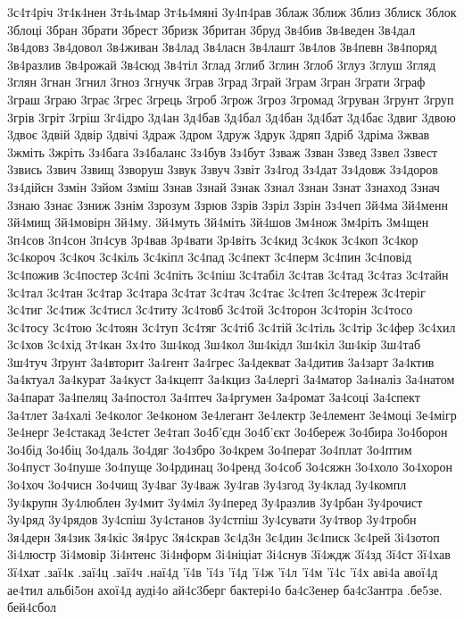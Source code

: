 {3с4т4річ
3т4к4нен
3т4ь4мар
3т4ь4мяні
3у4п4рав
3блаж
3ближ
3близ
3блиск
3блок
3блоці
3бран
3брати
3брест
3бризк
3британ
3бруд
3в4бив
3в4веден
3в4дал
3в4довз
3в4довол
3в4живан
3в4лад
3в4ласн
3в4лашт
3в4лов   
3в4певн
3в4поряд
3в4разлив
3в4рожай
3в4сюд
3в4тіл
3глад
3глиб
3глин
3глоб
3глуз
3глуш
3гляд
3глян
3гнан
3гнил
3гноз
3гнучк
3грав
3град
3грай
3грам
3гран
3грати
3граф
3граш
3граю
3грає
3грес
3грець
3гроб
3грож
3гроз
3громад
3груван
3грунт
3груп
3грів
3гріт
3гріш
3г4ідро
3д4ан
3д4бав
3д4бал
3д4бан
3д4бат
3д4бає
3двиг
3двою
3двоє
3двій
3двір
3двічі
3драж
3дром
3друж
3друк
3дряп
3дріб
3дріма
3жвав
3жміть
3жріть
3з4бага
3з4баланс
3з4був
3з4бут
3зваж
3зван
3звед
3звел
3звест
3звись 
3звич
3звищ
3зворуш
3звук
3звуч
3звіт     
3з4год     
3з4дат
3з4довж
3з4доров
3з4дійсн
3змін
3зйом
3зміш
3знав
3знай
3знак
3знал
3знан
3знат
3знаход
3знач
3знаю
3знає
3зниж
3знім
3зрозум
3зрюв 
3зрів 
3зріл 
3зрін 
3з4чеп
3й4ма
3й4менн
3й4мищ
3й4мовірн
3й4му.
3й4муть
3й4міть
3й4шов
3м4нож
3м4ріть
3м4щен
3п4сов
3п4сон
3п4сув
3р4вав
3р4вати
3р4віть
3с4кид
3с4кок
3с4коп     
3с4кор
3с4короч
3с4коч     
3с4кіль
3с4кіпл
3с4пад
3с4пект
3с4перм
3с4пин
3с4повід
3с4пожив
3с4постер
3с4пі
3с4піть
3с4піш
3с4табіл 
3с4тав 
3с4тад 
3с4таз
3с4тайн
3с4тал
3с4тан
3с4тар
3с4тара
3с4тат
3с4тач
3с4тає
3с4теп     
3с4тереж
3с4теріг
3с4тиг
3с4тиж
3с4тисл
3с4титу
3с4товб 
3с4той
3с4торон
3с4торін
3с4тосо
3с4тосу
3с4тою
3с4тоян 
3с4туп
3с4тяг
3с4тіб
3с4тій
3с4тіль
3с4тір
3с4фер
3с4хил
3с4хов
3с4хід
3т4кан
3х4то
3ш4код
3ш4кол
3ш4кідл
3ш4кіл
3ш4кір
3ш4таб
3ш4туч
3ґрунт
3а4вторит
3а4гент
3а4грес
3а4декват
3а4дитив
3а4зарт
3а4ктив
3а4ктуал
3а4курат
3а4куст
3а4кцепт
3а4кциз
3а4лергі
3а4матор
3а4наліз
3а4натом
3а4парат
3а4пеляц
3а4постол
3а4птеч
3а4ргумен
3а4ромат
3а4соці
3а4спект
3а4тлет
3а4халі
3е4колог
3е4коном
3е4легант
3е4лектр
3е4лемент
3е4моці
3е4мігр
3е4нерг
3е4стакад
3е4стет
3е4тап
3о4б'єдн
3о4б'єкт
3о4береж
3о4бира
3о4борон
3о4бід
3о4біц
3о4даль  
3о4дяг
3о4збро
3о4крем
3о4перат
3о4плат
3о4птим
3о4пуст
3о4пуше
3о4пуще
3о4рдинац
3о4ренд
3о4соб
3о4сяжн
3о4холо
3о4хорон
3о4хоч
3о4чисн
3о4чищ
3у4ваг
3у4важ
3у4гав
3у4згод
3у4клад
3у4компл
3у4крупн
3у4люблен
3у4мит
3у4міл
3у4перед
3у4разлив
3у4рбан
3у4рочист
3у4ряд
3у4рядов
3у4спіш
3у4станов
3у4стпіш
3у4сувати
3у4твор
3у4тробн
3я4дерн
3я4зик
3я4кіс
3я4рус
3я4скрав
3є4д3н
3є4дин
3є4писк
3є4рей
3і4зотоп
3і4люстр
3і4мовір
3і4нтенс
3і4нформ
3і4ніціат
3і4снув
3ї4ждж
3ї4зд
3ї4ст
3ї4хав
3ї4хат
.заї4к
.заї4ц
.заї4ч
.наї4д
'ї4в
'ї4з
'ї4д
'ї4ж
'ї4л
'ї4м
'ї4с
'ї4х
аві4а
авої4д
ае4тил
альбі5он
ахої4д
ауді4о
ай4с3берг
бактері4о
ба4с3енер
ба4с3антра
.бе5зе.
бей4сбол
}
